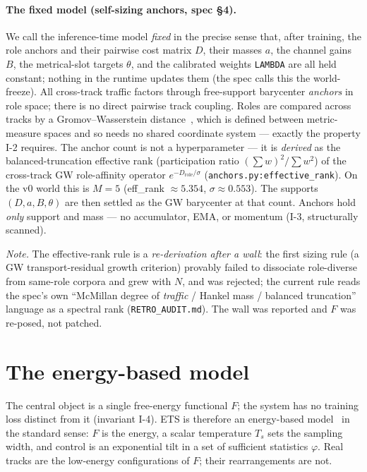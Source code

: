 \documentclass[11pt]{article}
\newcommand{\code}[1]{\texttt{\small #1}}
\begin{document}
\paragraph{The fixed model (self-sizing anchors, spec \S4).} We call the
inference-time model \emph{fixed} in the precise sense that, after training, the
role anchors and their pairwise cost matrix $D$, their masses $a$, the channel
gains $B$, the metrical-slot targets $\theta$, and the calibrated weights
\code{LAMBDA} are all held constant; nothing in the runtime updates them (the spec
calls this the world-freeze). All cross-track traffic
factors through free-support barycenter \emph{anchors} in role space; there is no
direct pairwise track coupling. Roles are compared across tracks by a
Gromov--Wasserstein distance~\cite{memoli2011gw,peyre2019cot}, which is defined
between metric-measure spaces and so needs no shared coordinate system --- exactly
the property I-2 requires. The anchor count is not a hyperparameter --- it is
\emph{derived} as the balanced-truncation effective rank (participation ratio
$(\sum w)^2/\sum w^2$) of the cross-track GW role-affinity operator
$e^{-D_{\mathrm{role}}/\sigma}$ (\code{anchors.py:effective\_rank}). On the v0
world this is $M=5$ (eff\_rank $\approx 5.354$, $\sigma \approx 0.553$). The
supports $(D,a,B,\theta)$ are then settled as the GW barycenter at that count.
Anchors hold \emph{only} support and mass --- no accumulator, EMA, or momentum
(I-3, structurally scanned).

\emph{Note.} The effective-rank rule is a \emph{re-derivation after a wall}:
the first sizing rule (a GW transport-residual growth criterion) provably failed
to dissociate role-diverse from same-role corpora and grew with $N$, and was
rejected; the current rule reads the spec's own ``McMillan degree of \emph{traffic}
/ Hankel mass / balanced truncation'' language as a spectral rank
(\code{RETRO\_AUDIT.md}). The wall was reported and $F$ was re-posed, not
patched.

\section{The energy-based model}

The central object is a single free-energy functional $F$; the system has no
training loss distinct from it (invariant I-4). ETS is therefore an
energy-based model~\cite{lecun2006tutorial,du2019implicit} in the standard sense:
$F$ is the energy, a scalar temperature $T_s$ sets the sampling width, and control
is an exponential tilt in a set of sufficient statistics $\varphi$. Real tracks are
the low-energy configurations of $F$; their rearrangements are not.
\end{document}
